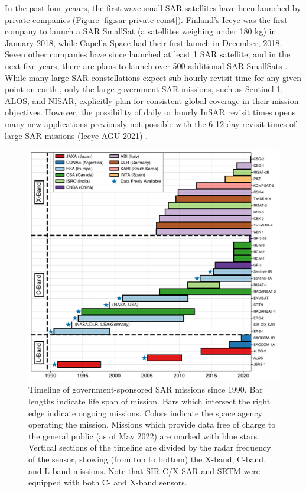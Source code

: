 In the past four yeaars, the first wave small SAR satellites have been launched by private companies (Figure \ref{fig:sar-private-const}). Finland's Iceye was the first company to launch a SAR SmallSat (a satellites weighing under 180 kg) in January 2018, while Capella Space had their first launch in December, 2018. Seven other companies have since launched at least 1 SAR satellite, and in the next five years, there are plans to launch over 500 additional SAR SmallSats \cite{Kulu2021SatelliteConstellations2021}.
While many large SAR constellations expect sub-hourly revisit time for any given point on earth \cite{Stringham2019CapellaXband}, only the large government SAR missions, such as Sentinel-1, ALOS, and NISAR, explicitly plan for consistent global coverage in their mission objectives. However, the possibility of daily or hourly InSAR revisit times opens many new applications previously not possible with the 6-12 day revisit times of large SAR missions  \cite{IceyeAgu2021}(Iceye AGU 2021) \cite{Taylor2021RemoteSensingMountain}.



\begin{figure}[!htbp]
	\centering
	\includegraphics[width=1.1\textwidth]{figures/chapter3-sar/sar-missions.pdf}
	\caption[Timeline of government SAR missions]{Timeline of government-sponsored SAR missions since 1990. Bar lengths indicate life span of mission. Bars which intersect the right edge indicate ongoing missions.
		Colors indicate the space agency operating the mission.
		Missions which provide data free of charge to the general public (as of May 2022) are marked with blue stars.
		Vertical sections of the timeline are divided by the radar frequency of the sensor, showing (from top to bottom) the X-band, C-band, and L-band missions.
		Note that SIR-C/X-SAR and SRTM were equipped with both C- and X-band sensors.}
	\label{fig:sar-missions}
\end{figure}



